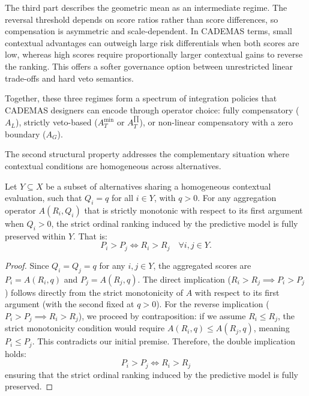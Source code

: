 \documentclass[mathematics,article,submit,moreauthors]{Definitions/mdpi}
\begin{document}
The third part describes the geometric mean as an intermediate regime. The reversal threshold depends on score ratios rather than score differences, so compensation is asymmetric and scale-dependent. In CADEMAS terms, small contextual advantages can outweigh large risk differentials when both scores are low, whereas high scores require proportionally larger contextual gains to reverse the ranking. This offers a softer governance option between unrestricted linear trade-offs and hard veto semantics.

Together, these three regimes form a spectrum of integration policies that CADEMAS designers can encode through operator choice: fully compensatory ($A_L$), strictly veto-based ($A_T^{\min}$ or $A_T^{\prod}$), or non-linear compensatory with a zero boundary ($A_G$).

The second structural property addresses the complementary situation where contextual conditions are homogeneous across alternatives.

\begin{Proposition}
\label{prop:cont_homog_rank_preserv}
    Let $Y \subseteq X$ be a subset of alternatives sharing a homogeneous contextual evaluation, such that $Q_i = q$ for all $i \in Y$, with $q > 0$. For any aggregation operator $A(R_i, Q_i)$ that is strictly monotonic with respect to its first argument when $Q_i > 0$, the strict ordinal ranking induced by the predictive model is fully preserved within $Y$. That is:
\begin{equation}
P_i > P_j \iff R_i > R_j \quad \forall i,j \in Y.
\end{equation}
\end{Proposition} 

\begin{proof}
Since $Q_i = Q_j = q$ for any $i,j \in Y$, the aggregated scores are $P_i = A(R_i, q)$ and $P_j = A(R_j, q)$.
The direct implication ($R_i > R_j \implies P_i > P_j$) follows directly from the strict monotonicity of $A$ with respect to its first argument (with the second fixed at $q > 0$). For the reverse implication ($P_i > P_j \implies R_i > R_j$), we proceed by contraposition: if we assume $R_i \leq R_j$, the strict monotonicity condition would require $A(R_i, q) \leq A(R_j, q)$, meaning $P_i \leq P_j$. This contradicts our initial premise. Therefore, the double implication holds: 
\[
P_i > P_j \iff R_i > R_j
\]
ensuring that the strict ordinal ranking induced by the predictive model is fully preserved.
\end{proof} 
\end{document}
